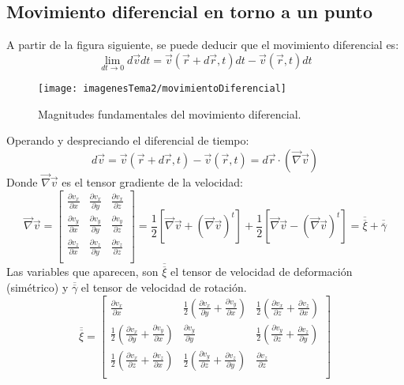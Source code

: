 \subsection{Movimiento diferencial en torno a un punto}
A partir de la figura siguiente, se puede deducir que el movimiento diferencial es:
\[\lim_{{dt \to 0}} d\vec{v}dt=\vec{v}(\vec{r}+d\vec{r},t)dt-\vec{v}(\vec r ,t)dt\]
\begin{figure}[H]
	\centering
	\texttt{[image: imagenesTema2/movimientoDiferencial]}
	\caption{Magnitudes fundamentales del movimiento diferencial.}
	\label{fig:movimientodiferencial}
\end{figure}
Operando y despreciando el diferencial de tiempo:
\[d\vec{v}=\vec{v}(\vec{r}+d\vec{r},t)-\vec{v}(\vec r ,t)=d\vec{r}\cdot(\vec{\nabla}\vec{v})\]
Donde $\vec{\nabla}\vec{v}$ es el tensor gradiente de la velocidad:
\setlength{\arraycolsep}{1.5pt}
\renewcommand{\arraystretch}{1.5}
\[\vec{\nabla}\vec{v}=\begin{bmatrix}
	\frac{\partial v_x}{\partial x} & \frac{\partial v_x}{\partial y} & \frac{\partial v_x}{\partial z} \\
	\frac{\partial v_y}{\partial x} & \frac{\partial v_y}{\partial y} & \frac{\partial v_y}{\partial z} \\
	\frac{\partial v_z}{\partial x} & \frac{\partial v_z}{\partial y} & \frac{\partial v_z}{\partial z} \\
\end{bmatrix}=\frac{1}{2}\left[\vec{\nabla}\vec{v}+\left(\vec{\nabla}\vec{v}\right)^t\right]+\frac{1}{2}\left[\vec{\nabla}\vec{v}-\left(\vec{\nabla}\vec{v}\right)^t\right]=\overline{\overline{\xi}}+\overline{\overline{\gamma}}\]
Las variables que aparecen, son $\overline{\overline{\xi}}$ el tensor de velocidad de deformación (simétrico) y $\overline{\overline{\gamma}}$ el tensor de velocidad de rotación.
\setlength{\arraycolsep}{1.5pt}
\renewcommand{\arraystretch}{1.5}
\[\overline{\overline{\xi}}=\begin{bmatrix}
	\frac{\partial v_x}{\partial x} & \frac{1}{2}\left(\frac{\partial v_x}{\partial y}+\frac{\partial v_y}{\partial x}\right) & \frac{1}{2}\left(\frac{\partial v_x}{\partial z}+\frac{\partial v_z}{\partial x}\right) \\
	\frac{1}{2}\left(\frac{\partial v_x}{\partial y}+\frac{\partial v_y}{\partial x}\right) & \frac{\partial v_y}{\partial y} & \frac{1}{2}\left(\frac{\partial v_y}{\partial z} +\frac{\partial v_z}{\partial y}\right) \\
	\frac{1}{2}\left(\frac{\partial v_x}{\partial z}+\frac{\partial v_z}{\partial x}\right) & \frac{1}{2}\left(\frac{\partial v_y}{\partial z} +\frac{\partial v_z}{\partial y}\right) & \frac{\partial v_z}{\partial z} \\
\end{bmatrix}\]
